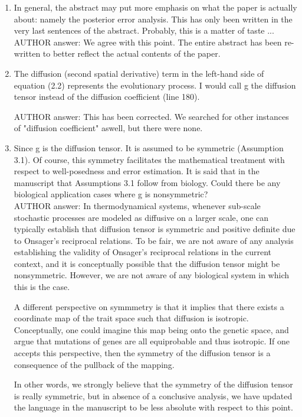\documentclass[a4paper,11pt]{scrartcl}
\begin{document}
\begin{enumerate}
\item
In general, the abstract may put more emphasis on what the paper is actually about: namely the posterior error analysis. This has only been written in the very last sentences of the abstract. Probably, this is a matter of taste ... \\

AUTHOR answer: We agree with this point. The entire abstract has been re-written to better reflect the actual contents of the paper.

\item
The diffusion (second spatial derivative) term in the left-hand side of equation (2.2) represents the evolutionary process. I would call g the diffusion tensor instead of the diffusion coefficient (line 180).

AUTHOR answer: This has been corrected. We searched for other instances of "diffusion coefficient" aswell, but there were none.

\item
Since g is the diffusion tensor. It is assumed to be symmetric (Assumption 3.1). Of course, this symmetry facilitates the mathematical treatment with respect to well-posedness and error estimation. It is said that in the manuscript that Assumptions 3.1 follow from biology. Could there be any biological application cases where g is nonsymmetric? \\

AUTHOR answer: 
In thermodynamical systems, whenever sub-scale stochastic processes are modeled as diffusive on a larger scale, one can typically establish that diffusion tensor is symmetric and positive definite due to Onsager's reciprocal relations. To be fair, we are not aware of any analysis establishing the validity of Onsager's reciprocal relations in the current context, and it is conceptually possible that the diffusion tensor might be nonsymmetric. However, we are not aware of any biological system in which this is the case. 

A different perspective on symmmetry is that it implies that there exists a coordinate map of the trait space such that diffusion is isotropic. Conceptually, one could imagine this map being onto the genetic space, and argue that mutations of genes are all equiprobable and thus isotropic. If one accepts this perspective, then the symmetry of the diffusion tensor is a consequence of the pullback of the mapping.  

In other words, we strongly believe that the symmetry of the diffusion tensor is really symmetric, but in absence of a conclusive analysis, we have updated the language in the manuscript to be less absolute with respect to this point. 



\end{enumerate}
\end{document}
